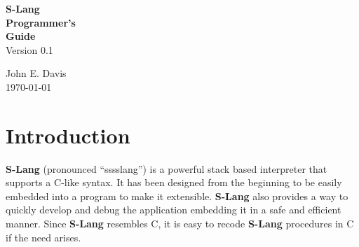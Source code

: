 \setlength{\oddsidemargin}{0mm}
\setlength{\evensidemargin}{0mm}
\setlength{\textwidth}{160mm}
\setlength{\topmargin}{-10mm}
\setlength{\textheight}{220mm}
\parindent=0mm
\parskip=5mm

\def\mytitle{S-Lang Programmer's Guide}

\newlength{\pagewidth}
\setlength{\pagewidth}{\textwidth}

\makeatletter
\def\ps@headings{\def\@oddfoot{}%
\def\@oddhead{\makebox[\textwidth][l]{\underline{\hbox to \pagewidth{\bf
\mytitle\hfill\thepage}}}}%
\def\@evenfoot{}%
\def\@evenhead{\makebox[\textwidth][l]{\underline{\hbox to \pagewidth{\bf
\mytitle\hfill\thepage}}}}}%
\pagestyle{headings}

\newcommand{\slang}{{\bf S-Lang}}
\newcommand{\jed}{{\bf jed}}
\newcommand{\exmp}[1]{{\tt #1}}
\newcommand{\var}[1]{{\tt #1}}



\thispagestyle{empty}
\vfill
\begin{center}
{\huge\bf
   S-Lang\\
\vspace{0.25in}
   Programmer's\\
\vspace{0.25in}
   Guide\\
}
\large
\vspace{0.5in}
   Version 0.1

\vfill

   John E. Davis\\
   \today
\end{center}
\vfill
\pagebreak


\tableofcontents
\section{Introduction}

   \slang{} (pronounced ``sssslang'') is a powerful stack based interpreter
   that supports a C-like syntax.  It has been designed from the beginning
   to be easily embedded into a program to make it extensible. \slang{} also
   provides a way to quickly develop and debug the application embedding it
   in a safe and efficient manner.  Since \slang{} resembles C, it is easy to
   recode \slang{} procedures in C if the need arises.

